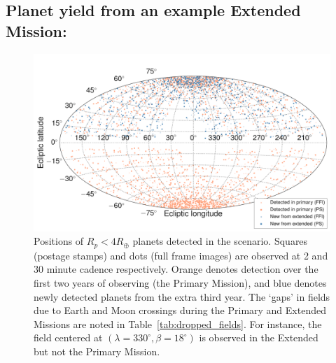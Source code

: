 \subsection{Planet yield from an example Extended Mission: {\rm \nhemi}}
\label{sec:results_from_nhemi_extended_mission}

\begin{figure}[t]
	\centering
	\includegraphics[]{figures/skymap_dropped_fields.pdf}
	\caption{Positions of $R_p<4R_\oplus$ planets detected in the \nhemi\:scenario. Squares (postage stamps) and dots (full frame images) are observed at 2 and 30 minute cadence respectively. Orange denotes detection over the first two years of observing (the Primary Mission), and blue denotes newly detected planets from the extra third year. The `gaps' in fields due to Earth and Moon crossings during the Primary and Extended Missions are noted in Table~\protect\ref{tab:dropped_fields}. For instance, the field centered at $(\lambda=330^\circ,\beta=18^\circ)$ is observed in the Extended but not the Primary Mission. }
	\label{fig:skymap_nhemi}
\end{figure}
